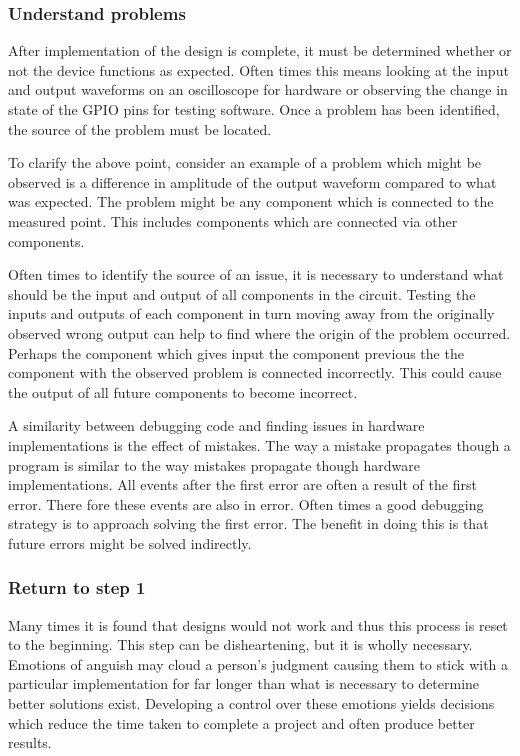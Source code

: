 \documentclass{article}	%
\begin{document}
\begin{multicols}{2}
\subsubsection{Understand problems}
After implementation of the design is complete,
it must be determined whether or not the device functions
as expected.
Often times this means looking at the input and
output waveforms on an oscilloscope for hardware or
observing the change in state of the GPIO pins for
testing software.
Once a problem has been identified,
the source of the problem must be located.

To clarify the above point, consider 
an example of a problem which might be observed is
a difference in amplitude of the output waveform
compared to what was expected.
The problem might be any component which is
connected to the measured point.
This includes components which are connected
via other components.

Often times to identify the source of an issue,
it is necessary to understand what should be
the input and output of all components in the circuit.
Testing the inputs and outputs of each component in turn
moving away from the originally observed wrong output can
help to find where the origin of the problem occurred.
Perhaps the component which gives input the component
previous the the component with the observed problem
is connected incorrectly.
This could cause the output of all future components to become incorrect.

A similarity between debugging code and
finding issues in hardware implementations is
the effect of mistakes.
The way a mistake propagates though a
program is similar to the way mistakes
propagate though hardware implementations.
All events after the first error are
often a result of the first error.
There fore these events are also in error.
Often times a good debugging strategy is
to approach solving the first error.
The benefit in doing this is that future errors
might be solved indirectly.

\subsubsection{Return to step 1}
Many times it is found that designs would not work
and thus this process is reset to the beginning.
This step can be disheartening, but
it is wholly necessary.
Emotions of anguish may cloud a person's judgment
causing them to stick with a particular implementation
for far longer than what is necessary to determine 
better solutions exist.
Developing a control over these emotions
yields decisions which reduce the time
taken to complete a project and
often produce better results.


\end{multicols}
\end{document}

